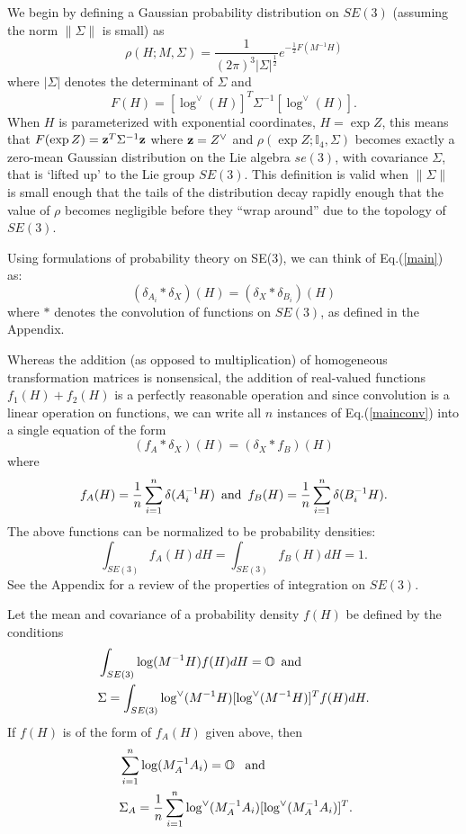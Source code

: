 \documentclass[twocolumn,10pt]{asme2ej}
\newcommand{\half}{\frac{1}{2}}
\begin{document}
We begin by defining a Gaussian probability distribution on $SE(3)$ (assuming the norm $\|\Sigma\|$ is small) as
$$ \rho(H; M, \Sigma) = \frac{1}{(2\pi)^3 |\Sigma|^{\half}} e^{-\half F(M^{-1} H)} $$
where $|\Sigma|$ denotes the determinant of $\Sigma$ and
$$ F(H) = [\log^{\vee}(H)]^T \Sigma^{-1} [\log^{\vee}(H)]. $$
When $H$ is parameterized with exponential coordinates, $H = \exp Z$, this means that
$F(\exp Z) = {\bf z}^T \Sigma^{-1}  {\bf z}$ where ${\bf z} = Z^{\vee}$ and
$\rho(\exp Z; \mathbb{I}_4, \Sigma)$ becomes exactly a zero-mean Gaussian distribution on the Lie algebra $se(3)$, with covariance $\Sigma$, that is `lifted up' to the Lie group $SE(3)$. This definition is valid when $\|\Sigma\|$ is small enough that the tails of the distribution decay rapidly enough that the value of $\rho$
becomes negligible before they ``wrap around'' due to the topology of $SE(3)$. 

Using formulations of probability theory on SE(3), we can think of Eq.(\ref{main}) as:
\begin{equation} (\delta_{A_i} * \delta_X)(H) = (\delta_X * \delta_{B_i})(H) \label{mainconv} \end{equation}
where $*$ denotes the convolution of functions on $SE(3)$, as defined in the Appendix.

Whereas the addition (as opposed to multiplication) of homogeneous transformation matrices is nonsensical, the addition of real-valued functions $f_1(H) + f_2(H)$ is a perfectly reasonable operation and since convolution is a linear operation on functions, we can write all $n$ instances of Eq.(\ref{mainconv}) into a single equation of the form
\begin{equation} (f_A * \delta_X)(H) = (\delta_X * f_B)(H) \label{mainconvall} \end{equation}
where $$ f_A(H) = \frac{1}{n} \sum_{i=1}^{n} \delta(A_i^{-1} H) \,\,\, {\rm and} \,\,\, f_B(H) = \frac{1}{n} \sum_{i=1}^{n} \delta(B_i^{-1} H). $$
The above functions can be normalized
to be probability densities:
$$ \int_{SE(3)} f_A(H) dH = \int_{SE(3)} f_B(H) dH = 1. $$
See the Appendix for a review of the properties of integration on $SE(3)$.

Let the mean and covariance of a probability density $f(H)$ be defined by the conditions
\begin{equation} \begin{split} &\int_{SE(3)} \log(M^{-1} H) f(H) dH = \mathbb{O} \,\,\, {\rm and} \,\,\,\\ &\Sigma = \int_{SE(3)} \log^{\vee}(M^{-1} H) [\log^{\vee}(M^{-1} H)]^T  f(H) dH . \end{split}\label{meancovdef} \end{equation}
If $f(H)$ is of the form of $f_A(H)$ given above, then
\begin{equation} \
\begin{split} &\sum_{i=1}^{n} \log(M_A^{-1} A_i) = \mathbb{O} {\rm \,\,\,\,\, and} \\
&\Sigma_A = \frac{1}{n} \sum_{i=1}^{n} \log^{\vee}(M_A^{-1} A_i) [\log^{\vee}(M_A^{-1} A_i)]^T.  \label{datameancovconvdef} \end{split}
\end{equation}
\end{document}
